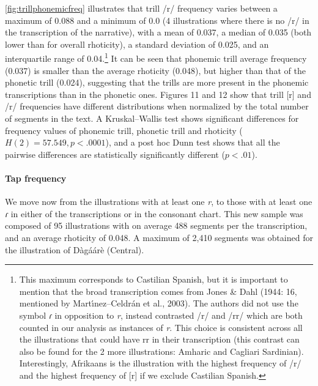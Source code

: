 \autoref{fig:trillphonemicfreq} illustrates that trill /r/ frequency varies between a maximum of 0.088 and a minimum of 0.0 (4 illustrations where there is no /r/ in the transcription of the narrative), with a mean of 0.037,  a median of 0.035 (both lower than for overall rhoticity), a standard deviation of 0.025, and an interquartile range of 0.04.\footnote{This maximum corresponds to Castilian Spanish, but it is important to mention that the broad transcription comes from Jones \& Dahl (1944: 16, mentioned by 	Martı́nez–Celdrán et al., 2003). The authors did not use the symbol \textit{ɾ} in opposition to \textit{r}, instead contrasted /r/ and /rr/ which are both counted in our analysis as instances of \textit{r}. This choice is consistent across all the illustrations that could have rr in their transcription (this contrast can also be found for the 2 more illustrations: Amharic and Cagliari Sardinian). Interestingly, Afrikaans is the illustration with the highest frequency of /r/ and the highest frequency of [r] if we exclude Castilian Spanish.} It can be seen that phonemic trill average frequency (0.037) is smaller than the average rhoticity (0.048), but higher than that of the phonetic trill (0.024), suggesting that the trills are more present in the phonemic transcriptions than in the phonetic ones. Figures 11 and 12 show that trill [r] and /r/ frequencies have different distributions when normalized by the total number of segments in the text. A Kruskal–Wallis test shows significant differences for frequency values of phonemic trill, phonetic trill and rhoticity ($H(2)=57.549,  p<.0001$), and a post hoc Dunn test shows that all the pairwise differences are statistically significantly different ($p<.01$).

\paragraph{Tap frequency}

We move now from the illustrations with at least one \textit{r}, to those with at least one \textit{ɾ} in either of the transcriptions or in the consonant chart. This new sample was composed of 95 illustrations with on average 488 segments per the transcription, and an average rhoticity of 0.048. A maximum of 2,410 segments was obtained for the illustration of Dàgáárè (Central).\\

